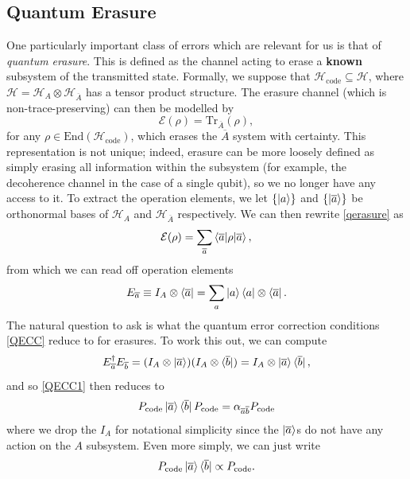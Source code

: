 \documentclass[12pt,a4paper]{report}
\numberwithin{equation}{section}
\newcommand{\ketbra}[2]{\ket{#1}\bra{#2}}
\newcommand{\ketbras}[1]{\ketbra{#1}{#1}}
\newcommand{\Pc}{P_{\text{code}}}
\newcommand{\Hcode}{\mathcal{H}_{\text{code}}}
\newcommand{\ol}[1]{\overline{#1}}
\theoremstyle{definition}
\theoremstyle{theorem}
\theoremstyle{theorem}
\theoremstyle{example}
\theoremstyle{definition}
\begin{document}
\subsection{Quantum Erasure}
One particularly important class of errors which are relevant for us is that of \textit{quantum erasure}. This is defined as the channel acting to erase a \textbf{known} subsystem of the transmitted state. Formally, we suppose that $\Hcode\subseteq\mathcal{H}$, where $\mathcal{H}=\mathcal{H}_{A}\otimes\mathcal{H}_{\ol{A}}$ has a tensor product structure. The erasure channel (which is non-trace-preserving) can then be modelled by
\begin{equation}\label{qerasure}
	\mathcal{E}(\rho)=\text{Tr}_{\ol{A}}(\rho),
\end{equation} 
for any $\rho\in\text{End}(\Hcode)$, which erases the $\ol{A}$ system with certainty. This representation is not unique; indeed, erasure can be more loosely defined as simply erasing all information within the subsystem (for example, the decoherence channel in the case of a single qubit), so we no longer have any access to it. To extract the operation elements, we let $\{\ket{a}\}$ and $\{\ket{\ol{a}}\}$ be orthonormal bases of $\mathcal{H}_{A}$ and $\mathcal{H}_{\ol{A}}$ respectively. We can then rewrite \ref{qerasure} as
\begin{equation}
	\mathcal{E}(\rho)=\sum_{\ol{a}}\braket{\ol{a}|\rho|\ol{a}},
\end{equation}
from which we can read off operation elements
\begin{equation}
	E_{\ol{a}}\equiv I_{A}\otimes\bra{\ol{a}}=\sum_{a}\ketbras{a}\otimes\bra{\ol{a}}.
\end{equation}
The natural question to ask is what the quantum error correction conditions \ref{QECC} reduce to for erasures. To work this out, we can compute
\begin{equation}
	E_{\ol{a}}^{\dagger}E_{\ol{b}}=(I_{A}\otimes\ket{\ol{a}})(I_{A}\otimes\bra{\ol{b}})=I_{A}\otimes\ketbra{\ol{a}}{\ol{b}},
\end{equation}
and so \ref{QECC1} then reduces to
\begin{equation}\label{Qerc}
	\Pc\ketbra{\ol{a}}{\ol{b}}\Pc=\alpha_{\ol{a}\ol{b}}\Pc
\end{equation}
where we drop the $I_{A}$ for notational simplicity since the $\ket{\ol{a}}$s do not have any action on the $A$ subsystem. Even more simply, we can just write
\begin{equation}
	\Pc\ketbra{\ol{a}}{\ol{b}}\propto\Pc.
\end{equation}
\end{document}
